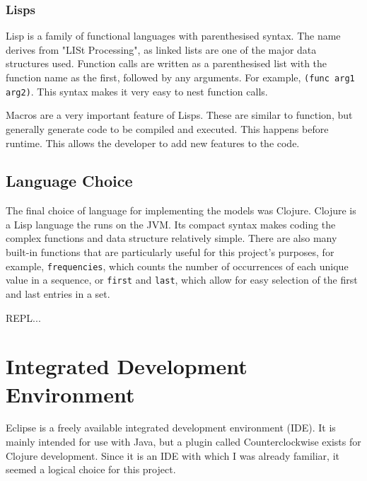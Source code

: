 
\subsubsection{Lisps}

Lisp is a family of functional languages with parenthesised syntax. The name derives from "LISt Processing", as linked lists are one of the major data structures used. Function calls are written as a parenthesised list with the function name as the first, followed by any arguments. For example, \lstinline!(func arg1 arg2)!. This syntax makes it very easy to nest function calls.

Macros are a very important feature of Lisps. These are similar to function, but generally generate code to be compiled and executed. This happens before runtime. This allows the developer to add new features to the code.


\subsection{Language Choice}

The final choice of language for implementing the models was Clojure. Clojure is a Lisp language the runs on the JVM. Its compact syntax makes coding the complex functions and data structure relatively simple. There are also many  built-in functions that are particularly useful for this project's purposes, for example, \lstinline!frequencies!, which counts the number of occurrences of each unique value in a sequence, or \lstinline!first! and \lstinline!last!, which allow for easy selection of the first and last entries in a set.

REPL...


\section{Integrated Development Environment}

Eclipse is a freely available integrated development environment (IDE). It is mainly intended for use with Java, but a plugin called Counterclockwise exists for Clojure development. Since it is an IDE with which I was already familiar, it seemed a logical choice for this project. 


